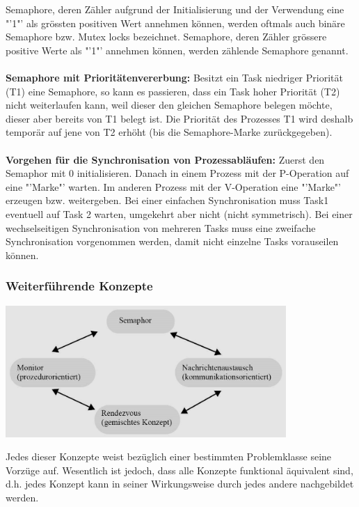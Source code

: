Semaphore, deren Zähler aufgrund der Initialisierung und der Verwendung eine "'1"' als grössten positiven Wert annehmen können, werden oftmals auch binäre Semaphore bzw. Mutex locks bezeichnet. Semaphore, deren Zähler grössere positive Werte als "'1"' annehmen können, werden zählende Semaphore genannt.\\\\
\textbf{Semaphore mit Prioritätenvererbung:} Besitzt ein Task niedriger Priorität (T1) eine Semaphore, so kann es passieren, dass ein Task hoher Priorität (T2) nicht weiterlaufen kann, weil dieser den gleichen Semaphore belegen möchte, dieser aber bereits von T1 belegt ist. Die Priorität des Prozesses T1 wird deshalb temporär auf jene von T2 erhöht (bis die Semaphore-Marke zurückgegeben).\\\\
\textbf{Vorgehen für die Synchronisation von Prozessabläufen:} Zuerst den Semaphor mit 0 initialisieren. Danach in einem Prozess mit der P-Operation auf eine "'Marke"' warten. Im anderen Prozess mit der V-Operation eine "'Marke"' erzeugen bzw. weitergeben. Bei einer einfachen Synchronisation muss Task1 eventuell auf Task 2 warten, umgekehrt aber nicht (nicht symmetrisch). Bei einer wechselseitigen Synchronisation von mehreren Tasks muss eine zweifache Synchronisation vorgenommen werden, damit nicht einzelne Tasks vorauseilen können. 

\subsubsection{Weiterführende Konzepte}
\begin{minipage}{0.5\textwidth}
    \includegraphics[width=0.8\textwidth]{images/Betriebssysteme/KonzepteInterprozesskommunikation.png}
\end{minipage}
\hfill
\begin{minipage}{0.45\textwidth}
    Jedes dieser Konzepte weist bezüglich einer bestimmten Problemklasse seine Vorzüge auf. Wesentlich ist jedoch, dass alle Konzepte funktional äquivalent sind, d.h. jedes Konzept kann in seiner Wirkungsweise durch jedes andere nachgebildet werden.
\end{minipage}

